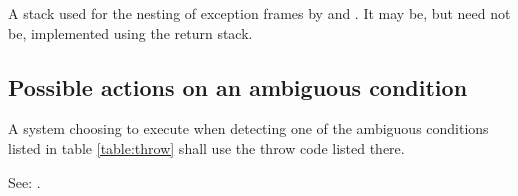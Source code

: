 A stack used for the nesting of exception frames by 
and . It may be, but need not be, implemented using
the return stack.


\subsection{Possible actions on an ambiguous condition} %
\label{exception:ambiguous}

A system choosing to execute  when detecting one of the
ambiguous conditions listed in table \ref{table:throw} shall use the
throw code listed there.

See: .


\newcommand{\throwdef}[3][\empty]{%
	\ifx\empty#1%
		\defthrowcode{#2}{#3}
		\newline
	\else
		\cbstart
			\uline{\defthrowcode{#2}{#3}}
			\hfill{\tiny\textsf{#1}}
		\cbend\newline
	\fi
}


\newcommand{\defthrowcode}[2]{%
	\makebox[1.6em][r]{#1}\hspace{1em}#2
}

